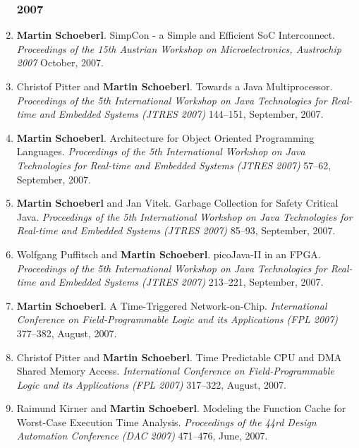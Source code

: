 \begin{enumerate}
\subsubsection*{2007}

\item {\bf Martin Schoeberl}.
 SimpCon - a Simple and Efficient SoC Interconnect.
 \emph{Proceedings of the 15th Austrian Workshop on Microelectronics, Austrochip 2007} October, 2007.

\item Christof Pitter and {\bf Martin Schoeberl}.
 Towards a Java Multiprocessor.
 \emph{Proceedings of the 5th International Workshop on Java Technologies for Real-time and Embedded Systems (JTRES 2007)} 144--151, September, 2007.

\item {\bf Martin Schoeberl}.
 Architecture for Object Oriented Programming Languages.
 \emph{Proceedings of the 5th International Workshop on Java Technologies for Real-time and Embedded Systems (JTRES 2007)} 57--62, September, 2007.

\item {\bf Martin Schoeberl} and Jan Vitek.
 Garbage Collection for Safety Critical Java.
 \emph{Proceedings of the 5th International Workshop on Java Technologies for Real-time and Embedded Systems (JTRES 2007)} 85--93, September, 2007.

\item Wolfgang Puffitsch and {\bf Martin Schoeberl}.
 picoJava-II in an FPGA.
 \emph{Proceedings of the 5th International Workshop on Java Technologies for Real-time and Embedded Systems (JTRES 2007)} 213--221, September, 2007.

\item {\bf Martin Schoeberl}.
 A Time-Triggered Network-on-Chip.
 \emph{International Conference on Field-Programmable Logic and its Applications (FPL 2007)} 377--382, August, 2007.

\item Christof Pitter and {\bf Martin Schoeberl}.
 Time Predictable CPU and DMA Shared Memory Access.
 \emph{International Conference on Field-Programmable Logic and its Applications (FPL 2007)} 317--322, August, 2007.

\item Raimund Kirner and {\bf Martin Schoeberl}.
 Modeling the Function Cache for Worst-Case Execution Time Analysis.
 \emph{Proceedings of the 44rd Design Automation Conference (DAC 2007)} 471--476, June, 2007.


\end{enumerate}
